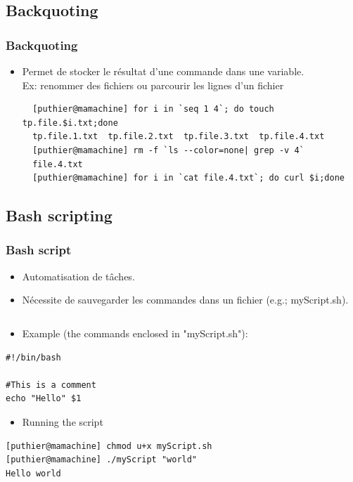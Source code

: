 \documentclass[10pt, xcolor=dvipsnames]{beamer}
\begin{document}
\subsection{Backquoting}
\begin{frame}[fragile]
  \frametitle{Backquoting}

  \begin{itemize}
  \item Permet de stocker le résultat d'une commande dans une variable.\\

    Ex: renommer des fichiers ou parcourir les lignes d'un fichier
    \begin{scriptsize}
\begin{verbatim}
  [puthier@mamachine] for i in `seq 1 4`; do touch tp.file.$i.txt;done
  tp.file.1.txt  tp.file.2.txt  tp.file.3.txt  tp.file.4.txt  
  [puthier@mamachine] rm -f `ls --color=none| grep -v 4`
  file.4.txt
  [puthier@mamachine] for i in `cat file.4.txt`; do curl $i;done
\end{verbatim}
    \end{scriptsize}
  \end{itemize}

\end{frame}

\subsection{Bash scripting}

\begin{frame}[fragile]
    \frametitle{Bash script}
       \begin{itemize}
	\item Automatisation de tâches.
        \item Nécessite de sauvegarder les commandes dans un fichier (e.g.; myScript.sh).
       \end{itemize}
    \begin{verbatim}
    \end{verbatim}
       \begin{itemize}
	\item Example (the commands enclosed in "myScript.sh"):
       \end{itemize}
    \begin{verbatim}
#!/bin/bash

#This is a comment
echo "Hello" $1
    \end{verbatim}

       \begin{itemize}
	\item Running the script
       \end{itemize}
\begin{verbatim}
[puthier@mamachine] chmod u+x myScript.sh
[puthier@mamachine] ./myScript "world"
Hello world
\end{verbatim}
\end{frame}
\end{document}

